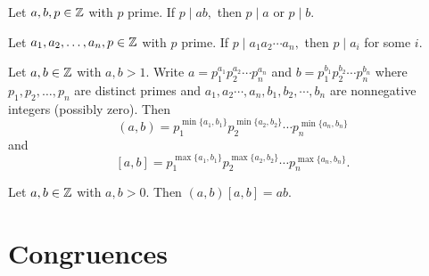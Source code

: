 \documentclass[letterpaper, 11 pt]{ximera}
\begin{document}
\begin{lemma}[Lemma 1.14]\label{lem:irreducible-prime}
    Let $a,b,p\in\mathbb Z$ with $p$ prime. If $p\mid ab,$ then $p\mid a$ or $p\mid b.$
\end{lemma}

\begin{corollary}[Corollary 1.15]\label{cor:irreducible-prime} Let $a_1,a_2,\dots,a_n,p\in\mathbb Z$ with $p$ prime. If $p\mid a_1a_2\cdots a_n,$ then $p\mid a_i$ for some $i.$
\end{corollary}

\begin{proposition}[Proposition 1.17]\label{prop:form-lcm-gcd}
 Let $a,b\in\mathbb Z$ with $a,b\gt 1.$ Write $a=p_1^{a_1}p_2^{a_2}\cdots  p_n^{a_n}$ and $b=p_1^{b_1}p_2^{b_2}\cdots p_n^{b_n}$ where $p_1,p_2,\dots,p_n$ are distinct primes and ${a_1},{a_2}\cdots,{a_n},{b_1},{b_2},\cdots,{b_n}$ are nonnegative integers (possibly zero). Then
        \[(a,b)=p_1^{\min\{a_1,b_1\}}p_2^{\min\{a_2,b_2\}}\cdots p_n^{\min\{a_n,b_n\}}\]
        and 
        \[[a,b]=p_1^{\max\{a_1,b_1\}}p_2^{\max\{a_2,b_2\}}\cdots p_n^{\max\{a_n,b_n\}}.\]
\end{proposition}

\begin{theorem}[Theorem 1.19]\label{thm:prod-lcm-gcd} Let $a,b\in\mathbb Z$ with $a,b\gt 0.$ Then $(a,b)[a,b]=ab.$
\end{theorem}

\section{Congruences}

            



    
\end{document}

